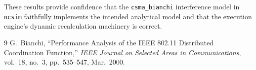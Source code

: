 \documentclass[11pt,a4paper]{article}
\newcommand{\ncsim}{\texttt{ncsim}}
\begin{document}
These results provide confidence that the \texttt{csma\_bianchi} interference model in \ncsim{} faithfully implements the intended analytical model and that the execution engine's dynamic recalculation machinery is correct.

\begin{thebibliography}{9}
G.~Bianchi, ``Performance Analysis of the IEEE 802.11 Distributed Coordination Function,'' \emph{IEEE Journal on Selected Areas in Communications}, vol.~18, no.~3, pp.~535--547, Mar.~2000.
\end{thebibliography}
\end{document}
